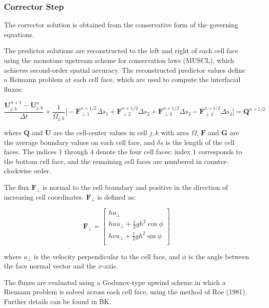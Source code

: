 \documentclass{article}
\begin{document}
 \subsubsection*{Corrector Step}
 
 The corrector solution is obtained from the conservative form of the governing equations.
 
 The predictor solutions are reconstructed to the left and right of each cell face using the monotone upstream scheme for conservation laws (MUSCL), which achieves second-order spatial accuracy.  The reconstructed predictor values define a Reimann problem at each cell face, which are used to compute the interfacial fluxes:
 
\begin{equation} 
	\dfrac{\mathbf{U}_{j,k}^{n+1} -\mathbf{U}_{j,k}^{n}}{\Delta t} 
	+ \dfrac{1}{\Omega_{j,k}} \big[ 
		- \mathbf{F}_{\perp 1}^{n+1/2} \Delta s_1
		+ \mathbf{F}_{\perp 2}^{n+1/2} \Delta s_2
		+ \mathbf{F}_{\perp 3}^{n+1/2} \Delta s_3
		- \mathbf{F}_{\perp 4}^{n+1/2} \Delta s_4		
	\big] = \mathbf{Q}^{n+1/2}
\end{equation}

\noindent where $\mathbf{Q}$ and $\mathbf{U}$ are the cell-center values in cell $j,k$ with area $\Omega$, $\mathbf{F}$ and $\mathbf{G}$ are the average boundary values on each cell face, and $\delta s$ is the length of the cell faces.
The indices 1 through 4 denote the four cell faces: index 1 corresponds to the bottom cell face, and the remaining cell faces are numbered in counter-clockwise order.

The flux $\mathbf{F}_\perp$  is normal to the cell boundary and positive in the direction of increasing cell coordinates.  $\mathbf{F}_\perp$  is defined as:

\[ \mathbf{F}_\perp = 
\begin{bmatrix} 
    h u_\perp \\[0.1cm]
    h u u_\perp + \frac{1}{2} g h^2 \cos \phi   \\[0.1cm]
    h v u_\perp + \frac{1}{2} g h^2 \sin \phi   \\[0.1cm]    
\end{bmatrix}  		
\]	

where $u_\perp$ is the velocity perpendicular to the cell face, and $\phi$ is the angle between the face normal vector and the $x$-axis.

The fluxes are evaluated using a Godunov-type upwind scheme in which a Riemann problem is solved across each cell face, using the method of Roe (1981).  Further details can be found in BK.
\end{document}
